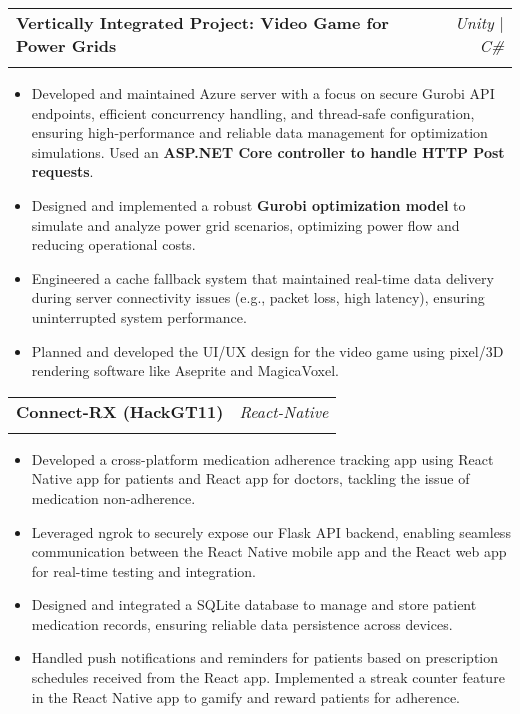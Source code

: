 \documentclass[letterpaper,11pt]{article}
\makeatletter
\newcommand{\resumeItem}[1]{
  \item\small{
    {#1 \vspace{-2pt}}
  }
}
\newcommand{\resumeSubheading}[4]{
  \vspace{-2pt}\item
    \begin{tabular*}{0.97\textwidth}[t]{l@{\extracolsep{\fill}}r}
      \textbf{#1} & #2 \\
      \textit{\small#3} & \textit{\small #4} \\
    \end{tabular*}\vspace{-7pt}
}
\newcommand{\resumeItemListStart}{\begin{itemize}}
\newcommand{\resumeItemListEnd}{\end{itemize}\vspace{-8pt}}
\makeatother
\begin{document}
    \resumeSubheading
      {Vertically Integrated Project: Video Game for Power Grids}{\textit{Unity $|$ C\#}}
      {}{}
      \resumeItemListStart
      \vspace{-5mm}
        \resumeItem{Developed and maintained Azure server with a focus on secure Gurobi API endpoints, efficient concurrency handling, and thread-safe configuration, ensuring high-performance and reliable data management for optimization simulations. Used an \textbf{ASP.NET Core controller to handle HTTP Post requests}.}
        \resumeItem{Designed and implemented a robust \textbf{Gurobi optimization model} to simulate and analyze power grid scenarios, optimizing power flow and reducing operational costs.}
        \resumeItem{Engineered a cache fallback system that maintained real-time data delivery during server connectivity issues (e.g., packet loss, high latency), ensuring uninterrupted system performance.}
        \resumeItem{Planned and developed the UI/UX design for the video game using pixel/3D rendering software like Aseprite and MagicaVoxel.} 
    \resumeItemListEnd

    \resumeSubheading
    {Connect-RX (HackGT11)}{\textit{React-Native}}
    {}{}
    \resumeItemListStart
    \vspace{-5mm}
      \resumeItem{Developed a cross-platform medication adherence tracking app using React Native app for patients and React app for doctors, tackling the issue of medication non-adherence.}
      \resumeItem{Leveraged ngrok to securely expose our Flask API backend, enabling seamless communication between the React Native mobile app and the React web app for real-time testing and integration.}
      \resumeItem{Designed and integrated a SQLite database to manage and store patient medication records, ensuring reliable data persistence across devices.}
      \resumeItem{Handled push notifications and reminders for patients based on prescription schedules received from the React app. Implemented a streak counter feature in the React Native app to gamify and reward patients for adherence.}
    \resumeItemListEnd

\end{document}
